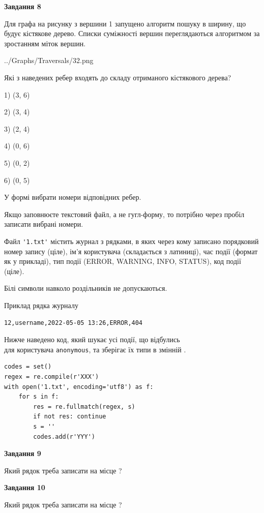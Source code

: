 \documentclass[12pt, ukrainian]{article}
\def\code#1{\Verb!#1!}
\begin{document}
{\begin {large}
{\begin {center}\textbf{Завдання 8}\end {center}}\par
Для графа на рисунку з вершини 1 запущено алгоритм пошуку в ширину, що будує кістякове дерево. Списки суміжності вершин переглядаються алгоритмом за зростанням міток вершин.\par
\begin{center}
	{../Graphs/Traversals/32.png}
\end{center}
\par Які з наведених ребер входять до складу отриманого кістякового дерева?\par
1) (3, 6)\par
2) (3, 4)\par
3) (2, 4)\par
4) (0, 6)\par
5) (0, 2)\par
6) (0, 5)\par
{\vskip 15pt} У формі вибрати номери відповідних ребер.


Якщо заповнюєте текстовий файл, а не гугл-форму, то потрібно через пробіл записа\-ти вибрані номери.\par
\newpage


Файл \code{'1.txt'} містить журнал з рядками, в яких через кому записано поряд\-ко\-вий номер запису (ціле), ім'я користувача (складається з латиниці), час події (фор\-мат як у прикладі), тип події (ERROR, WARNING, INFO, STATUS), код події (ціле).

Білі символи навколо роздільників не допускаються.

Приклад рядка журналу



\begin{verbatim}
12,username,2022-05-05 13:26,ERROR,404
\end{verbatim}


Нижче наведено код, який шукає усі події, що відбулись\\ для користувача \code{anonymous}, та зберігає їх типи в змінній .



\begin{verbatim}
codes = set()
regex = re.compile(r'XXX')
with open('1.txt', encoding='utf8') as f:
    for s in f:
        res = re.fullmatch(regex, s)
        if not res: continue
        s = ''
        codes.add(r'YYY')
\end{verbatim}


{\begin {center}\textbf{Завдання 9}\end {center}}\par
Який рядок треба записати на місце  ?\par
\vspace{5mm}


{\begin {center}\textbf{Завдання 10}\end {center}}\par
Який рядок треба записати на місце  ?\par


\newpage


\end {large}}
\end{document}
